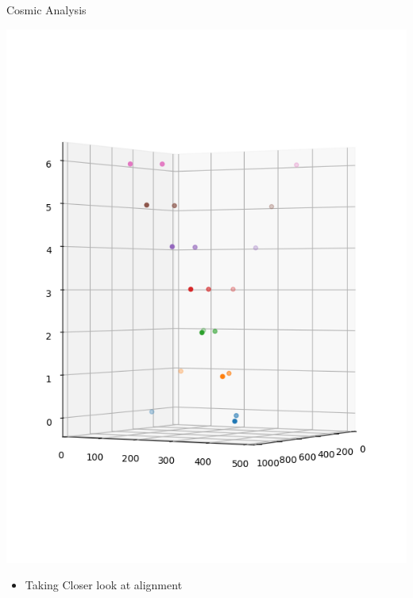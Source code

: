 \documentclass{beamer}
\begin{document}
\begin{frame}{Cosmic Analysis}
\begin{minipage}{.45\textwidth}
    \includegraphics[trim=0 50 0 100,clip,width=\textwidth]{DESY_After.png}
\end{minipage}
\begin{itemize}
    \item Taking Closer look at alignment
\end{itemize}
\end{frame}
\end{document}
